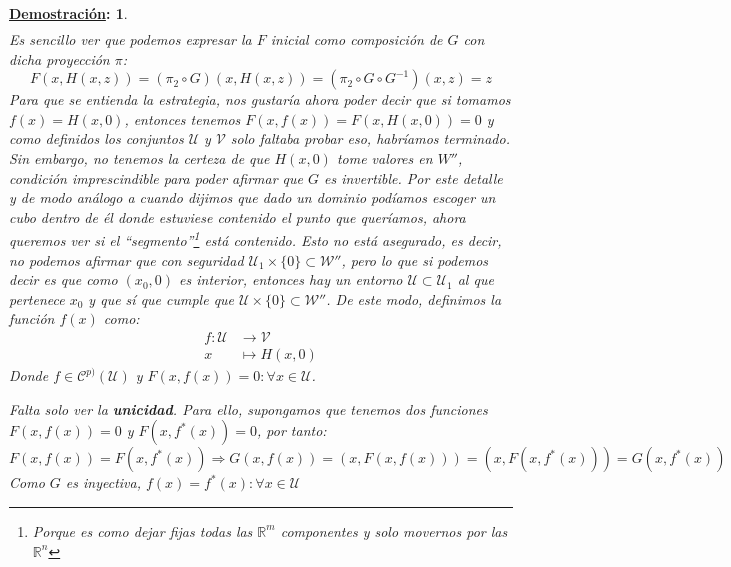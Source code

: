 \documentclass[10pt,a4paper,openright]{book}
\theoremstyle{break}
\newtheorem*{demo}{\underline{Demostración}:}
\begin{document}
\begin{demo}
\begin{align*}
\end{align*}
Es sencillo ver que podemos expresar la $F$ inicial como composición de $G$ con dicha proyección $\pi$:
$$F(x, H(x,z)) = (\pi_2 \circ G) (x, H(x,z)) = (\pi_2 \circ G \circ G^{-1}) (x,z) = z$$
Para que se entienda la estrategia, nos gustaría ahora poder decir que si tomamos $f(x)=H(x,0)$, entonces tenemos $F(x,f(x))=F(x,H(x,0))=0$ y como definidos los conjuntos $\mathcal{U}$ y $\mathcal{V}$ solo faltaba probar eso, habríamos terminado. Sin embargo, no tenemos la certeza de que $H(x,0)$ tome valores en $W''$, condición imprescindible para poder afirmar que $G$ es invertible. Por este detalle y de modo análogo a cuando dijimos que dado un dominio podíamos escoger un cubo dentro de él donde estuviese contenido el punto que queríamos, ahora queremos ver si el ``segmento''\footnote{Porque es como dejar fijas todas las $\mathbb{R}^m$ componentes y solo movernos por las $\mathbb{R}^{n}$} está contenido. Esto no está asegurado, es decir, no podemos afirmar que con seguridad $\mathcal{U}_{1}\times \{0\}\subset \mathcal{W}''$, pero lo que si podemos decir es que como $(x_0, 0)$ es interior, entonces hay un entorno $\mathcal{U}\subset \mathcal{U}_{1}$ al que pertenece $x_0$ y que sí que cumple que $\mathcal{U}\times \{0\} \subset \mathcal{W}''$. De este modo, definimos la función $f(x)$ como:
\begin{align*}
f: \mathcal{U} &\to \mathcal{V} \\ x &\mapsto H(x,0)
\end{align*} 
Donde $f \in \mathcal{C}^{p)} (\mathcal{U})$ y $F(x, f(x)) = 0 : \forall x \in \mathcal{U}$.

Falta solo ver la \textbf{unicidad}. Para ello, supongamos que tenemos dos funciones $F(x, f(x)) = 0$ y $F(x, f^* (x)) = 0$, por tanto:
$$F(x, f(x)) = F(x, f^*(x)) \Rightarrow G(x,f(x)) = (x, F(x,f(x))) = (x, F(x, f^* (x))) = G(x,f^* (x))$$
Como $G$ es inyectiva, $f(x) = f^* (x) : \forall x \in \mathcal{U}$
\end{demo}
\end{document}

